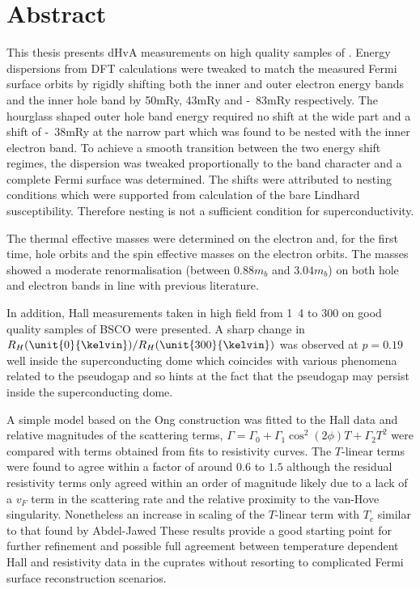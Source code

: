 \thispagestyle{empty}\null\clearpage

\setcounter{page}{1}


\section*{Abstract}


This thesis presents \ac{dHvA} measurements on high quality samples of \BaFeP{}. Energy dispersions from \ac{DFT} calculations were tweaked to match the measured Fermi surface orbits by rigidly shifting both the inner and outer electron energy bands and the inner hole band by \unit{50}{\textrm{mRy}}, \unit{43}{\textrm{mRy}} and \unit{-83}{\textrm{mRy}} respectively. The hourglass shaped outer hole band energy required no shift at the wide part and a shift of \unit{-38}{\textrm{mRy}} at the narrow part which was found to be nested with the inner electron band. To achieve a smooth transition between the two energy shift regimes, the dispersion was tweaked proportionally to the \DzTwo{} band character and a complete Fermi surface was determined. The shifts were attributed to nesting conditions which were supported from calculation of the bare Lindhard susceptibility. Therefore nesting is not a sufficient condition for superconductivity.

The thermal effective masses were determined on the electron and, for the first time, hole orbits and the spin effective masses on the electron orbits. The masses showed a moderate renormalisation (between $\unit{0.88}{m_b}$ and $\unit{3.04}{m_b}$) on both hole and electron bands in line with previous literature.

In addition, Hall measurements taken in high field from \unit{1.4}{\kelvin} to \unit{300}{\kelvin} on good quality samples of \ac{BSCO} were presented. A sharp change in $R_H(\unit{0}{\kelvin})/R_H(\unit{300}{\kelvin})$ was observed at $p=0.19$ well inside the superconducting dome which coincides with various phenomena related to the pseudogap and so hints at the fact that the pseudogap may persist inside the superconducting dome.


A simple model based on the Ong construction was fitted to the Hall data and relative magnitudes of the scattering terms, $\Gamma = \Gamma_0 + \Gamma_1 \cos^2(2\phi) T + \Gamma_2 T^2$ were compared with terms obtained from fits to resistivity curves. The $T$-linear terms were found to agree within a factor of around $0.6$ to $1.5$ although the residual resistivity terms only agreed within an order of magnitude likely due to a lack of a $v_F$ term in the scattering rate and the relative proximity to the van-Hove singularity. Nonetheless an increase in scaling of the $T$-linear term with $T_c$ similar to that found by Abdel-Jawed \etal{} These results provide a good starting point for further refinement and possible full agreement between temperature dependent Hall and resistivity data in the cuprates without resorting to complicated Fermi surface reconstruction scenarios.

